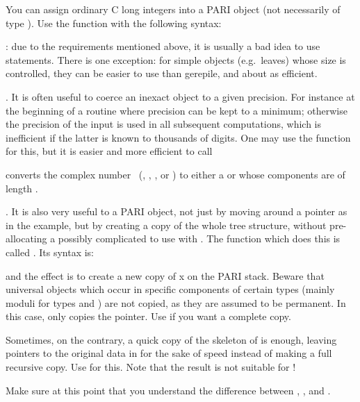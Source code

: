 You can assign ordinary C long integers into a PARI object (not necessarily
of type ). Use the function  with the following
syntax:


: due to the requirements mentioned above, it is usually
a bad idea to use  statements. There is one exception: for simple
objects (e.g.~leaves) whose size is controlled, they can be easier to use than
gerepile, and about as efficient.

. It is often useful to coerce an inexact object to a
given precision. For instance at the beginning of a routine where precision
can be kept to a minimum; otherwise the precision of the input is used in all
subsequent computations, which is inefficient if the latter is known to
thousands of digits. One may use the  function for this, but it
is easier and more efficient to call

 converts the complex number~
(, , ,  or ) to either
a  or  whose components are  of length
.

. It is also very useful to  a PARI object, not
just by moving around a pointer as in the  example, but by
creating a copy of the whole tree structure, without pre-allocating a
possibly complicated  to use with . The function which
does this is called . Its syntax is:


\noindent and the effect is to create a new copy of x on the PARI stack.
Beware that universal objects which occur in specific components of certain
types (mainly moduli for types  and ) are not
copied, as they are assumed to be permanent. In this case,  only
copies the pointer. Use  if you want a complete
copy. 

Sometimes, on the contrary, a quick copy of the skeleton of  is
enough, leaving pointers to the original data in  for the sake of
speed instead of making a full recursive copy. Use
 for this. Note that the result is not suitable
for  !

Make sure at this point that you understand the difference between , ,  and .

